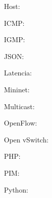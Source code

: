 \documentclass[12pt,a4paper,oneside]{book}
\begin{document}
Host: 


ICMP: 


IGMP:

JSON: 

Latencia: 

Mininet: 

Multicast: 

OpenFlow: 

Open vSwitch:

PHP: 

PIM:

Python: 

\end{document}
